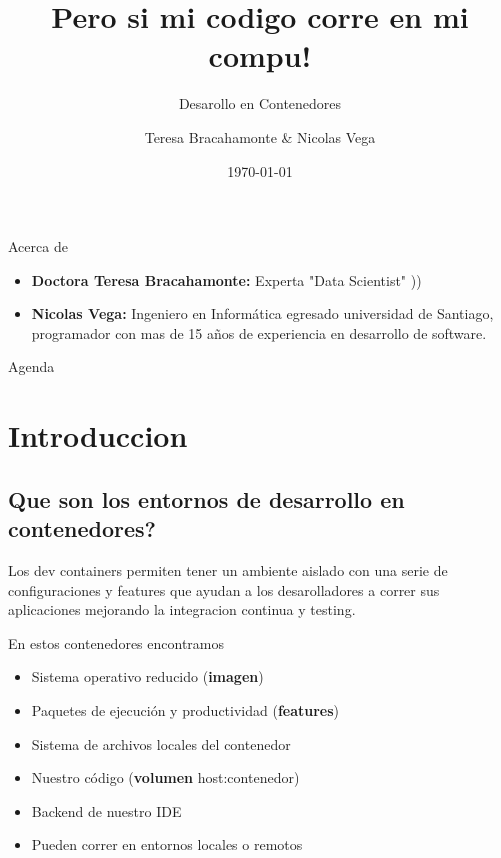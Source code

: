 \documentclass{beamer}
\title{Pero si mi codigo corre en mi compu!}
\subtitle{Desarollo en Contenedores}
\author{Teresa Bracahamonte \& Nicolas Vega}
\date{\today}
\begin{document}
\begin{frame}
  \titlepage
\end{frame}

\begin{frame}{Acerca de}
  \begin{itemize}
    \item \textbf{Doctora Teresa Bracahamonte:} Experta "Data Scientist" ))
    \item \textbf{Nicolas Vega:} Ingeniero en Informática egresado universidad de Santiago, programador con mas de 15 años de experiencia en desarrollo de software.
  \end{itemize}
\end{frame}

\begin{frame}{Agenda}
  \tableofcontents
\end{frame}

\section{Introduccion}
\subsection{Que son los entornos de desarrollo en contenedores?}
\begin{frame}{\subsecname}
  Los dev containers permiten tener un ambiente aislado con una serie de configuraciones 
  y features que ayudan a los desarolladores a correr sus aplicaciones mejorando la 
  integracion continua y testing.
  \begin{block}{En estos contenedores encontramos}
    \begin{itemize}
      \item Sistema operativo reducido (\textbf{imagen})
      \item Paquetes de ejecución y productividad (\textbf{features})
      \item Sistema de archivos locales del contenedor
      \item Nuestro código (\textbf{volumen} host:contenedor)
      \item Backend de nuestro IDE 
      \item Pueden correr en entornos locales o remotos
    \end{itemize}
  \end{block}
\end{frame}
\end{document}
